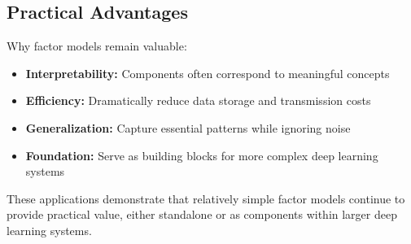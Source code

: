 \subsection{Practical Advantages}

Why factor models remain valuable:
\begin{itemize}
    \item \textbf{Interpretability:} Components often correspond to meaningful concepts
    \item \textbf{Efficiency:} Dramatically reduce data storage and transmission costs
    \item \textbf{Generalization:} Capture essential patterns while ignoring noise
    \item \textbf{Foundation:} Serve as building blocks for more complex deep learning systems
\end{itemize}

These applications demonstrate that relatively simple factor models continue to provide practical value, either standalone or as components within larger deep learning systems.


